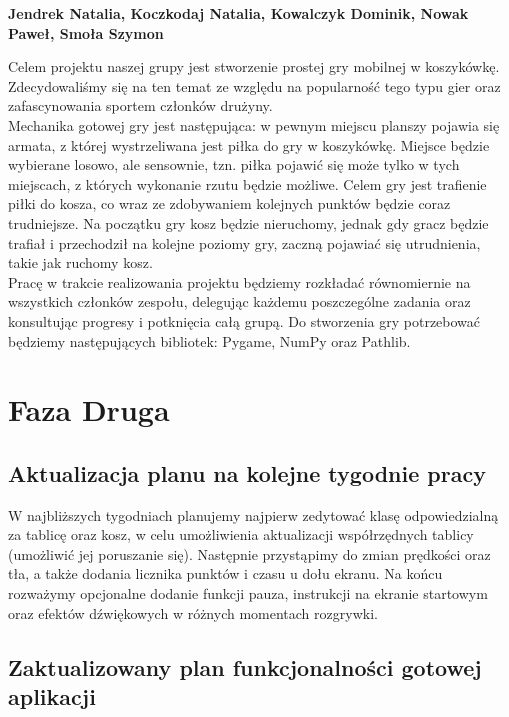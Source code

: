 \documentclass{article}
\begin{document}
\begin{center}
\large \textbf{Jendrek Natalia, Koczkodaj Natalia, Kowalczyk Dominik, Nowak Paweł, Smoła Szymon} \\
\end{center}

\bigskip

\large Celem projektu naszej grupy jest stworzenie prostej gry mobilnej w koszykówkę. Zdecydowaliśmy się na ten temat ze względu na popularność tego typu gier oraz zafascynowania sportem członków drużyny.\\

\smallskip
Mechanika gotowej gry jest następująca: w pewnym miejscu planszy pojawia się armata, z której wystrzeliwana jest piłka do gry w koszykówkę. Miejsce będzie wybierane losowo, ale sensownie, tzn. piłka pojawić się może tylko w tych miejscach, z których wykonanie rzutu będzie możliwe. Celem gry jest trafienie piłki do kosza, co wraz ze zdobywaniem kolejnych punktów będzie coraz trudniejsze. Na początku gry kosz będzie nieruchomy, jednak gdy gracz będzie trafiał i przechodził na kolejne poziomy gry, zaczną pojawiać się utrudnienia, takie jak ruchomy kosz.\\

\smallskip
\large Pracę w trakcie realizowania projektu będziemy rozkładać równomiernie na wszystkich członków zespołu, delegując każdemu poszczególne zadania oraz konsultując progresy i potknięcia całą grupą. Do stworzenia gry potrzebować będziemy następujących bibliotek: Pygame, NumPy oraz Pathlib. \\


\section{Faza Druga}
\subsection{Aktualizacja planu na kolejne tygodnie pracy}

\smallskip
\large W najbliższych tygodniach planujemy najpierw zedytować klasę odpowiedzialną za tablicę oraz kosz, w celu umożliwienia aktualizacji współrzędnych tablicy (umożliwić jej poruszanie się). Następnie przystąpimy do zmian prędkości oraz tła, a także dodania licznika punktów i czasu u dołu ekranu. Na końcu rozważymy opcjonalne dodanie funkcji pauza, instrukcji na ekranie startowym oraz efektów dźwiękowych w różnych momentach rozgrywki.

\subsection{Zaktualizowany plan funkcjonalności gotowej aplikacji}
\end{document}
